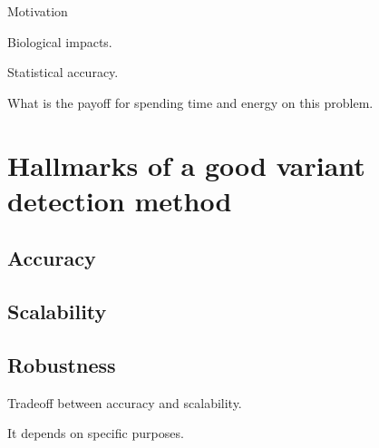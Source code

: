 \documentclass[11pt,reqno]{amsart}
\begin{document}
Motivation

Biological impacts.

Statistical accuracy.

What is the payoff for spending time and energy on this problem.




\section{Hallmarks of a good variant detection method}
\subsection{Accuracy}

\subsection{Scalability}

\subsection{Robustness}

Tradeoff between accuracy and scalability.

It depends on specific purposes.
\end{document}
